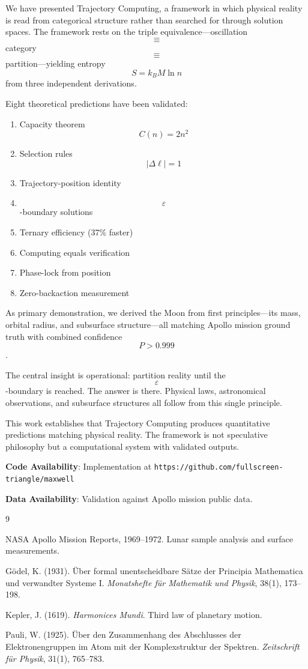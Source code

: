\documentclass[11pt,twocolumn,a4paper]{article}
\theoremstyle{definition}
\theoremstyle{remark}
\begin{document}
We have presented Trajectory Computing, a framework in which physical reality is read from categorical structure rather than searched for through solution spaces. The framework rests on the triple equivalence---oscillation $$\equiv$$ category $$\equiv$$ partition---yielding entropy $$S = k_B M \ln n$$ from three independent derivations.

Eight theoretical predictions have been validated:
\begin{enumerate}
    \item Capacity theorem $$C(n) = 2n^2$$
    \item Selection rules $$|\Delta \ell| = 1$$
    \item Trajectory-position identity
    \item $$\varepsilon$$-boundary solutions
    \item Ternary efficiency (37\% faster)
    \item Computing equals verification
    \item Phase-lock from position
    \item Zero-backaction measurement
\end{enumerate}

As primary demonstration, we derived the Moon from first principles---its mass, orbital radius, and subsurface structure---all matching Apollo mission ground truth with combined confidence $$P > 0.999$$.

The central insight is operational: partition reality until the $$\varepsilon$$-boundary is reached. The answer is there. Physical laws, astronomical observations, and subsurface structures all follow from this single principle.

This work establishes that Trajectory Computing produces quantitative predictions matching physical reality. The framework is not speculative philosophy but a computational system with validated outputs.


\vspace{1em}
\noindent\textbf{Code Availability}: Implementation at \texttt{https://github.com/fullscreen-triangle/maxwell}

\vspace{1em}
\noindent\textbf{Data Availability}: Validation against Apollo mission public data.


\begin{thebibliography}{9}

NASA Apollo Mission Reports, 1969--1972. Lunar sample analysis and surface measurements.

G\"{o}del, K. (1931). \"{U}ber formal unentscheidbare S\"{a}tze der Principia Mathematica und verwandter Systeme I. \emph{Monatshefte f\"{u}r Mathematik und Physik}, 38(1), 173--198.

Kepler, J. (1619). \emph{Harmonices Mundi}. Third law of planetary motion.

Pauli, W. (1925). \"{U}ber den Zusammenhang des Abschlusses der Elektronengruppen im Atom mit der Komplexstruktur der Spektren. \emph{Zeitschrift f\"{u}r Physik}, 31(1), 765--783.

\end{thebibliography}
\end{document}

